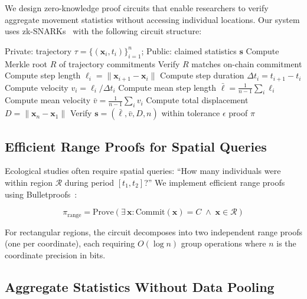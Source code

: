 \documentclass[11pt,letterpaper]{article}
\begin{document}
We design zero-knowledge proof circuits that enable researchers to verify aggregate movement statistics without accessing individual locations. Our system uses zk-SNARKs~\cite{groth2016} with the following circuit structure:

\begin{algorithm}[htbp]
\caption{ZK-MoveStats: Zero-Knowledge Movement Statistics}
\label{alg:zkmove}
\begin{algorithmic}[1]
\REQUIRE Private: trajectory $\tau = \{(\mathbf{x}_i, t_i)\}_{i=1}^n$; Public: claimed statistics $\mathbf{s}$
\STATE Compute Merkle root $R$ of trajectory commitments
\STATE Verify $R$ matches on-chain commitment
    \STATE Compute step length $\ell_i = \|\mathbf{x}_{i+1} - \mathbf{x}_i\|$
    \STATE Compute step duration $\Delta t_i = t_{i+1} - t_i$
    \STATE Compute velocity $v_i = \ell_i / \Delta t_i$
\ENDFOR
\STATE Compute mean step length $\bar{\ell} = \frac{1}{n-1}\sum_i \ell_i$
\STATE Compute mean velocity $\bar{v} = \frac{1}{n-1}\sum_i v_i$
\STATE Compute total displacement $D = \|\mathbf{x}_n - \mathbf{x}_1\|$
\STATE Verify $\mathbf{s} = (\bar{\ell}, \bar{v}, D, n)$ within tolerance $\epsilon$
\RETURN proof $\pi$
\end{algorithmic}
\end{algorithm}

\subsection{Efficient Range Proofs for Spatial Queries}

Ecological studies often require spatial queries: ``How many individuals were within region $\mathcal{R}$ during period $[t_1, t_2]$?'' We implement efficient range proofs using Bulletproofs~\cite{bunz2018}:

\begin{equation}
\pi_{\text{range}} = \text{Prove}\left(\exists\, \mathbf{x} : \text{Commit}(\mathbf{x}) = C \;\wedge\; \mathbf{x} \in \mathcal{R}\right)
\end{equation}

For rectangular regions, the circuit decomposes into two independent range proofs (one per coordinate), each requiring $O(\log n)$ group operations where $n$ is the coordinate precision in bits.

\subsection{Aggregate Statistics Without Data Pooling}
\end{document}
